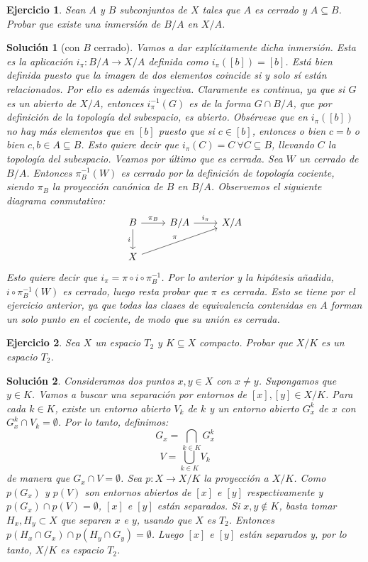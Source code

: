 \documentclass{article}
\theoremstyle{plain}
\newtheorem{exercise}{Ejercicio}
\newtheorem*{sol*}{Solución}
\begin{document}
\newpage
\begin{exercise}
Sean $A$ y $B$ subconjuntos de $X$ tales que $A$ es cerrado y $A \subseteq B$. Probar que existe una inmersión de $B/A$ en $X/A$.
\end{exercise}
\begin{sol*}[con $B$ cerrado]
Vamos a dar explícitamente dicha inmersión. Esta es la aplicación $i_\pi:B/A\rightarrow X/A$ definida como $i_\pi([b])=[b]$. Está bien definida puesto que la imagen de dos elementos coincide si y solo sí están relacionados. Por ello es además inyectiva. Claramente es continua, ya que si $G$ es un abierto de $X/A$, entonces $i_\pi^{-1}(G)$ es de la forma $G\cap B/A$, que por definición de la topología del subespacio, es abierto. Obsérvese que en $i_\pi([b])$ no hay más elementos que en $[b]$ puesto que si $c\in[b]$, entonces o bien $c=b$ o bien $c,b\in A\subseteq B$. Esto quiere decir que $i_\pi(C)=C\ \forall C\subseteq B$, llevando $C$ la topología del subespacio. Veamos por último que es cerrada. Sea $W$ un cerrado de $B/A$. Entonces $\pi_B^{-1}(W)$ es cerrado por la definición de topología cociente, siendo $\pi_B$ la proyección canónica de $B$ en $B/A$. Observemos el siguiente diagrama conmutativo:
\[
\begin{tikzcd}
B\arrow[r,"\pi_B"]\arrow[d,"i"'] & B/A\arrow[r,"i_\pi"] & X/A\\
X\arrow[urr,"\pi"]
\end{tikzcd}
\]
Esto quiere decir que $i_\pi=\pi\circ i\circ \pi_B^{-1}$. Por lo anterior y la hipótesis añadida, $i\circ \pi_B^{-1}(W)$ es cerrado, luego resta probar que $\pi$ es cerrada. Esto se tiene por el ejercicio anterior, ya que todas las clases de equivalencia contenidas en $A$ forman un solo punto en el cociente, de modo que su unión es cerrada. 
\end{sol*}

\newpage
\begin{exercise}
Sea $X$ un espacio $T_2$ y $K \subseteq X$ compacto. Probar que $X/K$ es un espacio $T_2$.
\end{exercise}
\begin{sol*}
Consideramos dos puntos $x, y \in X$ con $x \neq y$. Supongamos que $y\in K$. Vamos a buscar una separación por entornos de $[x],[y] \in X/K$. Para cada $k \in K$, existe un entorno abierto $V_k$ de $k$ y un entorno abierto $G^k_x$ de $x$ con $G^k_x \cap V_k = \emptyset$. Por lo tanto, definimos:
\[ G_x = \bigcap_{k \in K} G^k_x \]
\[ V = \bigcup_{k \in K} V_k \]
de manera que $G_x \cap V = \emptyset$. Sea $p : X \to X/K$ la proyección a $X/K$. Como $p(G_x)$ y $p(V)$ son entornos abiertos de $[x]$ e $[y]$ respectivamente y $p(G_x) \cap p(V) = \emptyset$, $[x]$ e $[y]$ están separados. Si $x,y \notin K$, basta tomar $H_x, H_y \subset X$ que separen $x$ e $y$, usando que $X$ es $T_2$. Entonces $p(H_x \cap G_x) \cap p(H_y \cap G_y) = \emptyset$. Luego $[x]$ e $[y]$ están separados y, por lo tanto, $X/K$ es espacio $T_2$.
\end{sol*}
\end{document}
